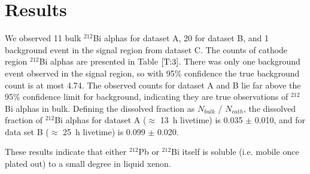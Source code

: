 
\FloatBarrier
\section{Results}
\label{results}
We observed 11 bulk $^{212}$Bi alphas for dataset A, 20 for dataset B, and 1 background event in the signal region from dataset C. The counts of cathode region $^{212}$Bi alphas are presented in Table $\ref{T:3}$. There was only one background event observed in the signal region, so with 95\% confidence the true background count is at most 4.74. The observed counts for dataset A and B lie far above the 95\% confidence limit for background, indicating they are true observations of  $^{212}$Bi alphas in bulk. Defining the dissolved fraction as $N_{bulk}$ / $N_{cath}$, the dissolved fraction of $^{212}$Bi alphas for dataset A ($\approx$ 13~h livetime) is 0.035 $\pm$ 0.010, and for data set B ($\approx$ 25~h livetime) is 0.099 $\pm$ 0.020. 

These results indicate that either $^{212}$Pb or $^{212}$Bi itself is soluble (i.e. mobile once plated out) to a small degree in liquid xenon. 



